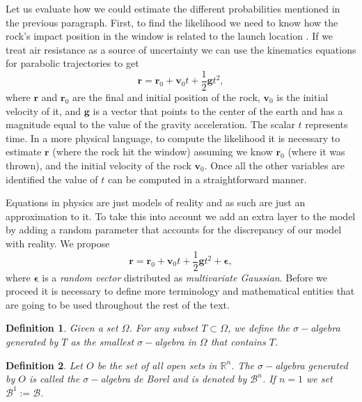 \documentclass[12pt]{book}
\newtheorem{definition}{Definition}
\begin{document}
Let us evaluate how we could estimate the different probabilities mentioned in the previous paragraph. 
First, to find the likelihood
we need to know how the rock's impact position  in the window  is related to the launch location 
. If we treat air resistance as a source of uncertainty  we can use
the kinematics equations  for parabolic trajectories to get \cite{arnol2013mathematical}
\begin{equation}\label{eqnKinematics}
\textbf{r}=\textbf{r}_{0}+\textbf{v}_{0}t+\frac{1}{2}\textbf{g}t^{2},
\end{equation} 
where $\textbf{r}$ and $\textbf{r}_{0}$ are the final and initial position of the rock, 
$\textbf{v}_{0}$ is 
the initial velocity of it,  and $\textbf{g}$ is  a vector that points to the center of the earth and has a 
magnitude equal to the value of the gravity acceleration. The scalar $t$ represents time.
In a more physical language, to compute the likelihood it is necessary to estimate $\textbf{r}$ (where the 
rock hit the window) assuming we know $\textbf{r}_{0}$ (where it was thrown), and the initial velocity 
of the rock $\textbf{v}_{0}$. 
Once all the other variables are identified the value of $t$ can be computed in a straightforward manner. 

Equations in physics are just models of reality and as such are just an approximation to it. To take
this into account we add an extra layer to the model by adding a random parameter that accounts
for the discrepancy of our model with reality. We propose 
\begin{equation}\label{eqnParabolicEpsilon}
\textbf{r}=\textbf{r}_{0}+\textbf{v}_{0}t+\frac{1}{2}\textbf{g}t^{2}+\mathbf{\epsilon},
\end{equation} 
where $\mathbf{\epsilon}$ is a \textit{random vector} distributed as \textit{multivariate Gaussian}. 
Before we proceed it is necessary to define more terminology and mathematical entities  that are going 
to be used throughout the rest of the text. 

\begin{definition}
Given a set $\Omega$. For any subset $T\subset\Omega$, we define the $\sigma-$algebra generated by $T$ as
the smallest $\sigma-$algebra in $\Omega$ that contains $T$.
\end{definition}

\begin{definition}
Let $O$ be the set of all open sets in $\mathbb{R}^{n}$. The $\sigma-$algebra generated by $O$ is called
the $\sigma-$algebra de Borel and is denoted by $\mathcal{B}^{n}$. If $n=1$ we set 
$\mathcal{B}^{1}:=\mathcal{B}$.
\end{definition}
\end{document}
